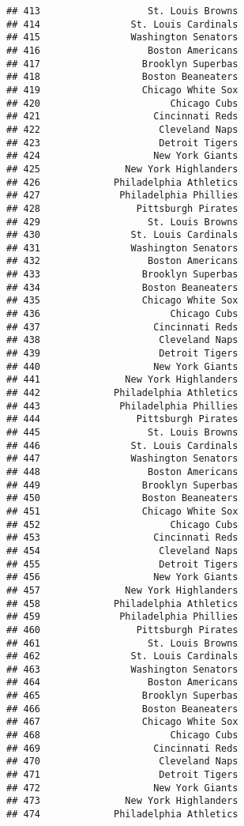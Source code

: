 \documentclass[]{article}
\begin{document}
\begin{verbatim}
## 413                   St. Louis Browns
## 414                St. Louis Cardinals
## 415                Washington Senators
## 416                   Boston Americans
## 417                  Brooklyn Superbas
## 418                  Boston Beaneaters
## 419                  Chicago White Sox
## 420                       Chicago Cubs
## 421                    Cincinnati Reds
## 422                     Cleveland Naps
## 423                     Detroit Tigers
## 424                    New York Giants
## 425               New York Highlanders
## 426             Philadelphia Athletics
## 427              Philadelphia Phillies
## 428                 Pittsburgh Pirates
## 429                   St. Louis Browns
## 430                St. Louis Cardinals
## 431                Washington Senators
## 432                   Boston Americans
## 433                  Brooklyn Superbas
## 434                  Boston Beaneaters
## 435                  Chicago White Sox
## 436                       Chicago Cubs
## 437                    Cincinnati Reds
## 438                     Cleveland Naps
## 439                     Detroit Tigers
## 440                    New York Giants
## 441               New York Highlanders
## 442             Philadelphia Athletics
## 443              Philadelphia Phillies
## 444                 Pittsburgh Pirates
## 445                   St. Louis Browns
## 446                St. Louis Cardinals
## 447                Washington Senators
## 448                   Boston Americans
## 449                  Brooklyn Superbas
## 450                  Boston Beaneaters
## 451                  Chicago White Sox
## 452                       Chicago Cubs
## 453                    Cincinnati Reds
## 454                     Cleveland Naps
## 455                     Detroit Tigers
## 456                    New York Giants
## 457               New York Highlanders
## 458             Philadelphia Athletics
## 459              Philadelphia Phillies
## 460                 Pittsburgh Pirates
## 461                   St. Louis Browns
## 462                St. Louis Cardinals
## 463                Washington Senators
## 464                   Boston Americans
## 465                  Brooklyn Superbas
## 466                  Boston Beaneaters
## 467                  Chicago White Sox
## 468                       Chicago Cubs
## 469                    Cincinnati Reds
## 470                     Cleveland Naps
## 471                     Detroit Tigers
## 472                    New York Giants
## 473               New York Highlanders
## 474             Philadelphia Athletics

\end{verbatim}
\end{document}
